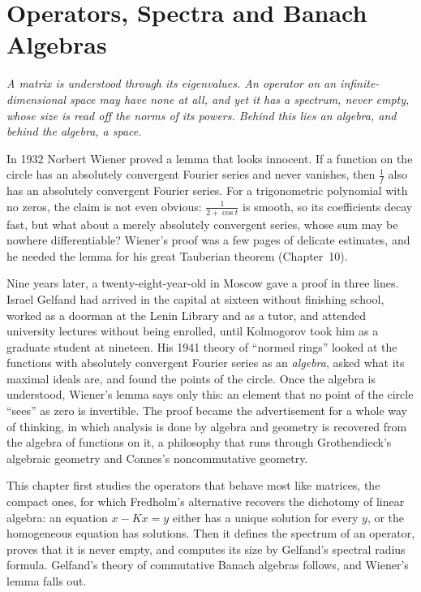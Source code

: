 \chapter{Operators, Spectra and Banach Algebras}

\begin{center}\itshape
A matrix is understood through its eigenvalues. An operator on an infinite-dimensional space may have none at all, and yet it has a
spectrum, never empty, whose size is read off the norms of its powers. Behind this lies an algebra, and behind the algebra, a space.
\end{center}

In 1932 Norbert Wiener proved a lemma that looks innocent. If a function on the circle has an absolutely convergent Fourier series and
never vanishes, then $\frac1f$ also has an absolutely convergent Fourier series. For a trigonometric polynomial with no zeros, the claim
is not even obvious: $\frac1{2+\cos t}$ is smooth, so its coefficients decay fast, but what about a merely absolutely convergent
series, whose sum may be nowhere differentiable? Wiener's proof was a few pages of delicate estimates, and he needed the lemma for his
great Tauberian theorem (Chapter~10).

Nine years later, a twenty-eight-year-old in Moscow gave a proof in three lines. Israel Gelfand had arrived in the capital at sixteen
without finishing school, worked as a doorman at the Lenin Library and as a tutor, and attended university lectures without being
enrolled, until Kolmogorov took him as a graduate student at nineteen. His 1941 theory of ``normed rings'' looked at the functions with
absolutely convergent Fourier series as an \emph{algebra}, asked what its maximal ideals are, and found the points of the circle. Once
the algebra is understood, Wiener's lemma says only this: an element that no point of the circle ``sees'' as zero is invertible. The
proof became the advertisement for a whole way of thinking, in which analysis is done by algebra and geometry is recovered from the
algebra of functions on it, a philosophy that runs through Grothendieck's algebraic geometry and Connes's noncommutative geometry.

This chapter first studies the operators that behave most like matrices, the compact ones, for which Fredholm's alternative recovers
the dichotomy of linear algebra: an equation $x-Kx=y$ either has a unique solution for every $y$, or the homogeneous equation has
solutions. Then it defines the spectrum of an operator, proves that it is never empty, and computes its size by Gelfand's
spectral radius formula. Gelfand's theory of commutative Banach algebras follows, and Wiener's lemma falls out.

